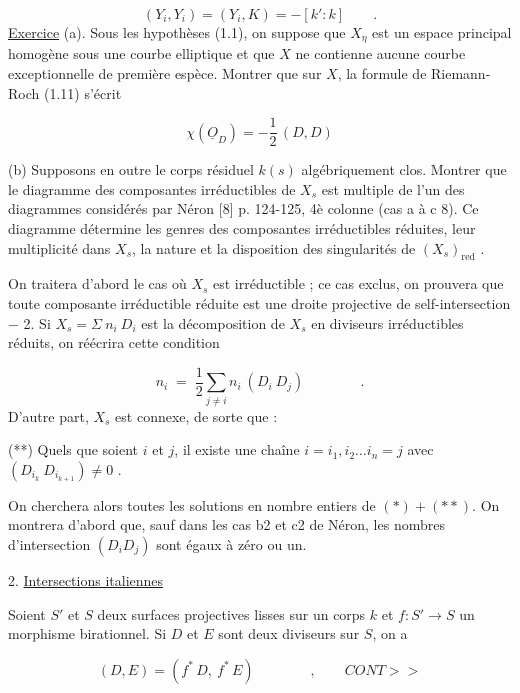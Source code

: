 \begin{equation*}
(Y_i,Y_i) = (Y_i,K) = -[k':k] \qquad .
\end{equation*}
\underline{Exercice} (a). Sous les hypothèses (1.1), on suppose que $X_\eta$ est un espace principal homogène sous une courbe elliptique et que $X$ ne contienne aucune courbe exceptionnelle de première espèce. Montrer que sur $X$, la formule de Riemann-Roch (1.11) s'écrit

\begin{equation*}
\chi(\underline{O}_D) = - \frac{1}{2} \, (D,D)
\end{equation*}


(b) Supposons en outre le corps résiduel $k(s)$ algébriquement clos. Montrer que le diagramme des composantes irréductibles de $X_s$ est multiple de l'un des diagrammes considérés par Néron [8] p. 124-125, 4è colonne (cas a à c 8). Ce diagramme détermine les genres des composantes irréductibles réduites, leur multiplicité dans $X_s$, la nature et la disposition des singularités de $(X_s)_{\mathrm{red}}$ .

On traitera d'abord le cas où $X_s$ est irréductible ; ce cas exclus, on prouvera que toute composante irréductible réduite est une droite projective de self-intersection $-$ 2. Si $X_s = \Sigma\ n_i\ D_i$ est la décomposition de $X_s$ en diviseurs irréductibles réduits, on réécrira cette condition

\begin{equation}\tag{*}
n_i \;=\; \frac{1}{2} \sum_{j \neq i} n_i \ (D_i \ D_j) \qquad\qquad .
\end{equation}
D'autre part, $X_s$ est connexe, de sorte que :

(**) Quels que soient $i$ et $j$, il existe une chaîne $i = i_1, i_2 \ldots i_n = j$ avec $(D_{i_k} \ D_{i_{k+1}}) \neq 0$ .

On cherchera alors toutes les solutions en nombre entiers de $(*) + (**)$. On montrera d'abord que, sauf dans les cas b2 et c2 de Néron, les nombres d'intersection $(D_i D_j)$ sont égaux à zéro ou un.


2. \underline{Intersections italiennes}

Soient $S'$ et $S$ deux surfaces projectives lisses sur un corps $k$ et $f : S' \longrightarrow S$ un morphisme birationnel. Si $D$ et $E$ sont deux diviseurs sur $S$, on a

\begin{equation*}
(D,E) = (f^* \, D, \ f^* \, E) \qquad\qquad , \qquad CONT>>
\end{equation*}

